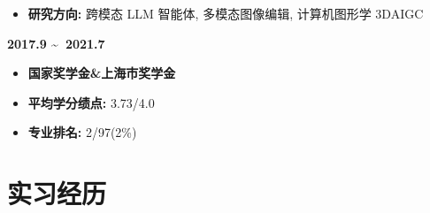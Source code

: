 \documentclass[UTF8,AutoFakeBold]{resume}
\begin{document}
    \begin{itemize}
      \item \kaishu\textbf{研究方向: }跨模态 LLM 智能体, 多模态图像编辑, 计算机图形学 3DAIGC
    \end{itemize}
{\quad \textbf{2017.9 \textasciitilde \ 2021.7}}
    \begin{minipage}[t]{0.30\textwidth}
    	\begin{itemize}
    		\item \kaishu\textbf{国家奖学金\&上海市奖学金}
    	\end{itemize}
    \end{minipage}
    \begin{minipage}[t]{0.25\textwidth}
    	\begin{itemize}
    		\item \kaishu\textbf{平均学分绩点: }3.73/4.0
    	\end{itemize}
    \end{minipage}
    \begin{minipage}[t]{0.25\textwidth}
    	\begin{itemize}
    		\item \kaishu\textbf{专业排名: }2/97(2\%)
    	\end{itemize}
    \end{minipage}

\section{\hspace{0.25em}\makebox[0.75em][c]{\faUsers} \fangsong\textbf{实习经历}}
\end{document}
